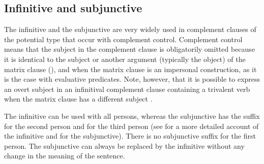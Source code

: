 
\subsection{Infinitive and subjunctive}
\label{ssec:Infinitive and subjunctive}

The infinitive and the subjunctive are very widely used in complement clauses of the potential type that occur with complement control. Complement control means that the subject in the complement clause is obligatorily omitted because it is identical to the subject or another argument (typically the object) of the matrix clause (), and when the matrix clause is an impersonal construction, as it is the case with evaluative predicates. Note, however, that it is possible to express an overt subject in an infinitival complement clause containing a trivalent verb when the matrix clause has a different subject .

The infinitive can be used with all persons, whereas the subjunctive has the suffix  for the second person and  for the third person (see  for a more detailed account of the infinitive and  for the subjunctive). There is no subjunctive suffix for the first person. The subjunctive can always be replaced by the infinitive without any change in the meaning of the sentence.

